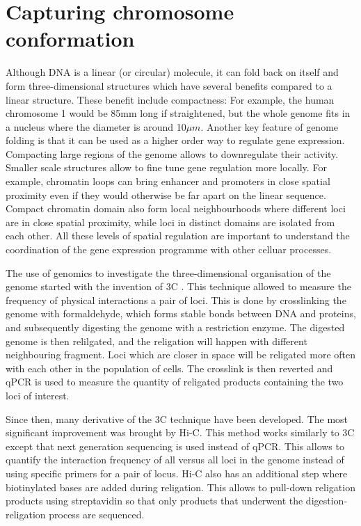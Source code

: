 \section{Capturing chromosome conformation}

Although DNA is a linear (or circular) molecule, it can fold back on itself and form three-dimensional structures which have several benefits compared to a linear structure. These benefit include compactness: For example, the human chromosome 1 would be 85mm long if straightened, but the whole genome fits in a nucleus where the diameter is around 10$\mu m$. Another key feature of genome folding is that it can be used as a higher order way to regulate gene expression. Compacting large regions of the genome allows to downregulate their activity. Smaller scale structures allow to fine tune gene regulation more locally. For example, chromatin loops can bring enhancer and promoters in close spatial proximity even if they would otherwise be far apart on the linear sequence. Compact chromatin domain also form local neighbourhoods where different loci are in close spatial proximity, while loci in distinct domains are isolated from each other. All these levels of spatial regulation are important to understand the coordination of the gene expression programme with other celluar processes.

The use of genomics to investigate the three-dimensional organisation of the genome started with the invention of \acrfull{3C} \cite{Dekker2002}. This technique allowed to measure the frequency of physical interactions a pair of loci. This is done by crosslinking the genome with formaldehyde, which forms stable bonds between DNA and proteins, and subsequently digesting the genome with a restriction enzyme. The digested genome is then relilgated, and the religation will happen with different neighbouring fragment. Loci which are closer in space will be religated more often with each other in the population of cells. The crosslink is then reverted and qPCR is used to measure the quantity of religated products containing the two loci of interest. 

Since then, many derivative of the \acrshort{3C} technique have been developed. The most significant improvement was brought by Hi-C. This method works similarly to 3C except that next generation sequencing is used instead of qPCR. This allows to quantify the interaction frequency of all versus all loci in the genome instead of using specific primers for a pair of locus. Hi-C also has an additional step where biotinylated bases are added during religation. This allows to pull-down religation products using streptavidin so that only products that underwent the digestion-religation process are sequenced.

